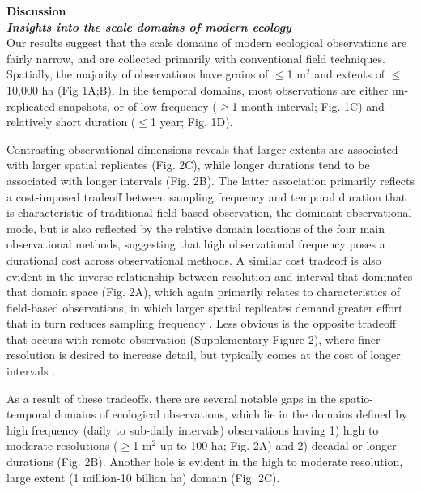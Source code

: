 \documentclass[12pt]{article}
\begin{document}
\vspace{10pt}
\noindent \textbf{Discussion}
\vspace{5pt}
\\
\noindent \textbf{\emph{Insights into the scale domains of modern ecology}}\\
Our results suggest that the scale domains of modern ecological observations are fairly narrow, and are collected primarily with conventional field techniques. Spatially, the majority of observations have grains of $\leq$1 m$^2$ and extents of $\leq$10,000 ha (Fig 1A;B). In the temporal domains, most observations are either un-replicated snapshots, or of low frequency ($\geq$1 month interval; Fig. 1C) and relatively short duration ($\leq$1 year; Fig. 1D). 

Contrasting observational dimensions reveals that larger extents are associated with larger spatial replicates (Fig. 2C), while longer durations tend to be associated with longer intervals (Fig. 2B). The latter association primarily reflects a cost-imposed tradeoff between sampling frequency and temporal duration that is characteristic of traditional field-based observation, the dominant observational mode, but is also reflected by the relative domain locations of the four main observational methods, suggesting that high observational frequency poses a durational cost across observational methods. A similar cost tradeoff is also evident in the inverse relationship between resolution and interval that dominates that domain space (Fig. 2A), which again primarily relates to characteristics of field-based observations, in which larger spatial replicates demand greater effort that in turn reduces sampling frequency \cite{kareiva_spatial_1988}. Less obvious is the opposite tradeoff that occurs with remote observation (Supplementary Figure 2), where finer resolution is desired to increase detail, but typically comes at the cost of longer intervals \cite{estes_platform_2016}.   

As a result of these tradeoffs, there are several notable gaps in the spatio-temporal domains of ecological observations, which lie in the domains defined by high frequency (daily to sub-daily intervals) observations having 1) high to moderate resolutions ($\geq$1 m$^2$ up to 100 ha; Fig. 2A) and 2) decadal or longer durations (Fig. 2B).  Another hole is evident in the high to moderate resolution, large extent (1 million-10 billion ha) domain (Fig. 2C). 
\end{document}
